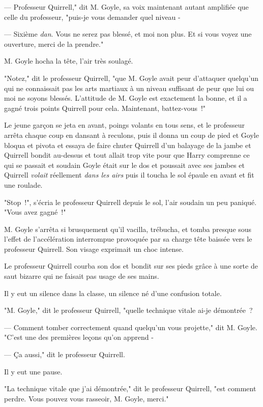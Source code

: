 --- Professeur Quirrell," dit M. Goyle, sa voix maintenant autant amplifiée que celle du professeur, "puis-je vous demander quel niveau -

--- Sixième \emph{dan}. Vous ne serez pas blessé, et moi non plus. Et si vous voyez une ouverture, merci de la prendre."

M. Goyle hocha la tête, l'air très soulagé.

"Notez," dit le professeur Quirrell, "que M. Goyle avait peur d'attaquer quelqu'un qui ne connaissait pas les arts martiaux à un niveau suffisant de peur que lui ou moi ne soyons blessés. L'attitude de M. Goyle est exactement la bonne, et il a gagné trois points Quirrell pour cela. Maintenant, battez-vous~!"

Le jeune garçon se jeta en avant, poings volants en tous sens, et le professeur arrêta chaque coup en dansant à reculons, puis il donna un coup de pied et Goyle bloqua et pivota et essaya de faire chuter Quirrell d'un balayage de la jambe et Quirrell bondit au-dessus et tout allait trop vite pour que Harry comprenne ce qui se passait et soudain Goyle était sur le dos et poussait avec ses jambes et Quirrell \emph{volait} réellement \emph{dans les airs} puis il toucha le sol épaule en avant et fit une roulade.

"Stop~!", s'écria le professeur Quirrell depuis le sol, l'air soudain un peu paniqué. "Vous avez gagné~!"

M. Goyle s'arrêta si brusquement qu'il vacilla, trébucha, et tomba presque sous l'effet de l'accélération interrompue provoquée par sa charge tête baissée vers le professeur Quirrell. Son visage exprimait un choc intense.

Le professeur Quirrell courba son dos et bondit sur ses pieds grâce à une sorte de saut bizarre qui ne faisait pas usage de ses mains.

Il y eut un silence dans la classe, un silence né d'une confusion totale.

"M. Goyle," dit le professeur Quirrell, "quelle technique vitale ai-je démontrée~?

--- Comment tomber correctement quand quelqu'un vous projette," dit M. Goyle. "C'est une des premières leçons qu'on apprend -

--- Ça aussi," dit le professeur Quirrell.

Il y eut une pause.

"La technique vitale que j'ai démontrée," dit le professeur Quirrell, "est comment perdre. Vous pouvez vous rasseoir, M. Goyle, merci."

